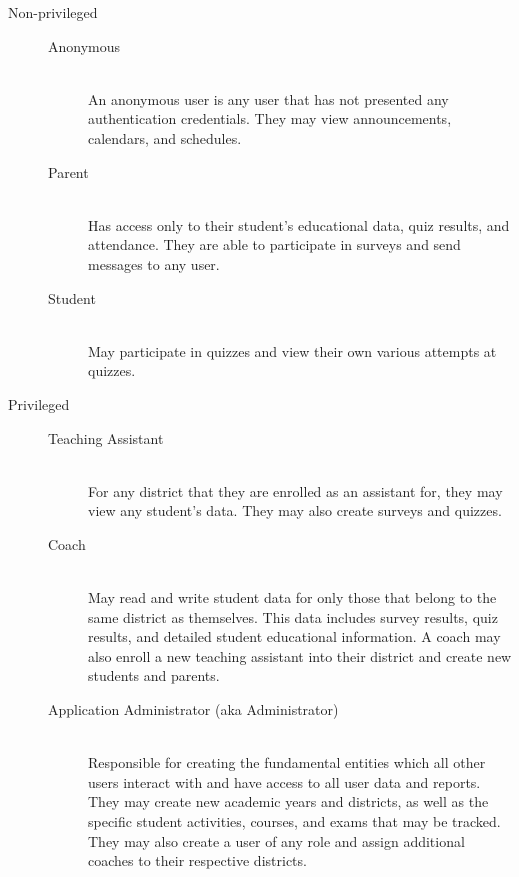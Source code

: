 \begin{description}
	\item [Non-privileged] \hfill
		\begin{description}
			\item [Anonymous] \hfill \\ An anonymous user is any user that has not presented any authentication credentials. They may view announcements, calendars, and schedules.
			\item [Parent] \hfill \\ Has access only to their student's educational data, quiz results, and attendance. They are able to participate in surveys and send messages to any user.
			\item [Student] \hfill \\ May participate in quizzes and view their own various attempts at quizzes.
		\end{description}
	\item [Privileged] \hfill
		\begin{description}
			\item [Teaching Assistant] \hfill \\ For any district that they are enrolled as an assistant for, they may view any student's data. They may also create surveys and quizzes.
			\item [Coach] \hfill \\ May read and write student data for only those that belong to the same district as themselves. This data includes survey results, quiz results, and detailed student educational information. A coach may also enroll a new teaching assistant into their district and  create new students and parents.
			\item [Application Administrator (aka Administrator)] \hfill \\ Responsible for creating the fundamental entities which all other users interact with and have access to all user data and reports. They may create new academic years and districts, as well as the specific student activities, courses, and exams that may be tracked. They may also create a user of any role and assign additional coaches to their respective districts.
		\end{description}
\end{description}